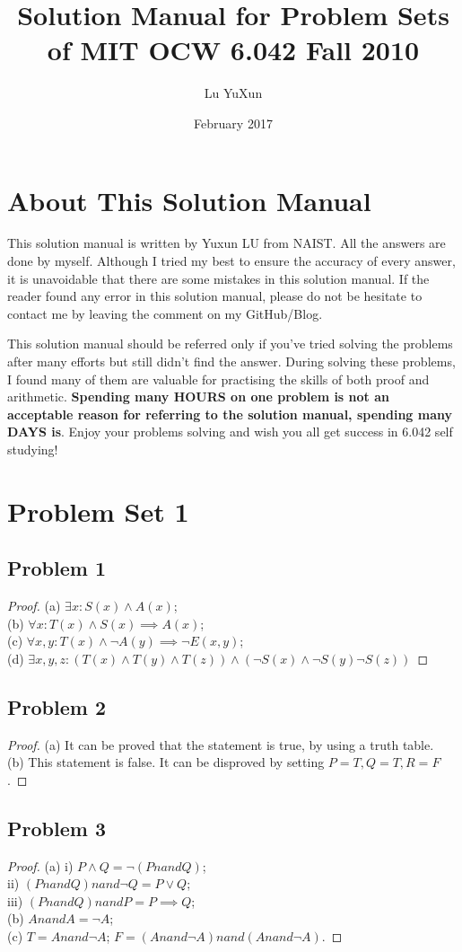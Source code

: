 \documentclass{article}
\title{Solution Manual for Problem Sets of MIT OCW 6.042 Fall 2010}
\author{Lu YuXun}
\date{February 2017}
\begin{document}
\maketitle
\section{About This Solution Manual}
This solution manual is written by Yuxun LU from NAIST. All the answers are done by myself. Although I tried my best to ensure the accuracy of every answer, it is unavoidable that there are some mistakes in this solution manual. If the reader found any error in this solution manual, please do not be hesitate to contact me by leaving the comment on my GitHub/Blog.

This solution manual should be referred only if you've tried solving the problems after many efforts but still didn't find the answer. During solving these problems, I found many of them are valuable for practising the skills of both proof and  arithmetic. \textbf{Spending many HOURS on one problem is not an acceptable reason for referring to the solution manual, spending many DAYS is}. Enjoy your problems solving and wish you all get success in 6.042 self studying!
\section{Problem Set 1}
\subsection{Problem 1}
\begin{proof}
(a) $\exists x: S(x) \wedge A(x)$;
\\(b) $\forall x: T(x) \wedge S(x) \implies A(x)$;
\\(c) $\forall x,y: T(x) \wedge \neg A(y) \implies \neg E(x,y)$;
\\(d) $\exists x,y,z: ( T(x) \wedge T(y) \wedge T(z) ) \wedge ( \neg S(x) \wedge \neg S(y) \neg S(z) )$
\end{proof}
\subsection{Problem 2}
\begin{proof}
(a) It can be proved that the statement is true, by using a truth table.\\
(b) This statement is false. It can be disproved by setting $P=T, Q=T, R=F$.
\end{proof}
\subsection{Problem 3}
\begin{proof}
(a) i) $P \wedge Q = \neg (P nand Q)$; \\
ii) $(P nand Q) nand \neg Q = P \vee Q$; \\
iii) $(P nand Q) nand P = P \implies Q$; \\
(b) $A nand A = \neg A$; \\
(c) $T = A nand \neg A$; $F = (A nand \neg A) nand (A nand \neg A)$.
\end{proof}
\end{document}
